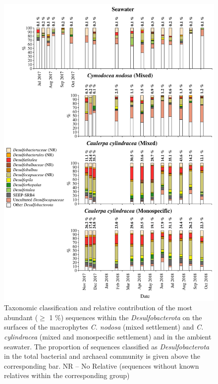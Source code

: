 \documentclass[12pt,]{article}
\begin{document}
\begin{figure}[H]

{\centering \includegraphics[width=0.85\linewidth]{../results/figures/desulfobacterota_bar_plot} 

}

\caption{Taxonomic classification and relative contribution of the most abundant ($\geq$ 1 \si{\percent}) sequences within the \textit{Desulfobacterota} on the surfaces of the macrophytes \textit{C. nodosa} (mixed settlement) and \textit{C. cylindracea} (mixed and monospecific settlement) and in the ambient seawater. The proportion of sequences classified as \textit{Desulfobacterota} in the total bacterial and archaeal community is given above the corresponding bar. NR -- No Relative (sequences without known relatives within the corresponding group)\label{desulfo}}\label{fig:unnamed-chunk-9}
\end{figure}
\end{document}
